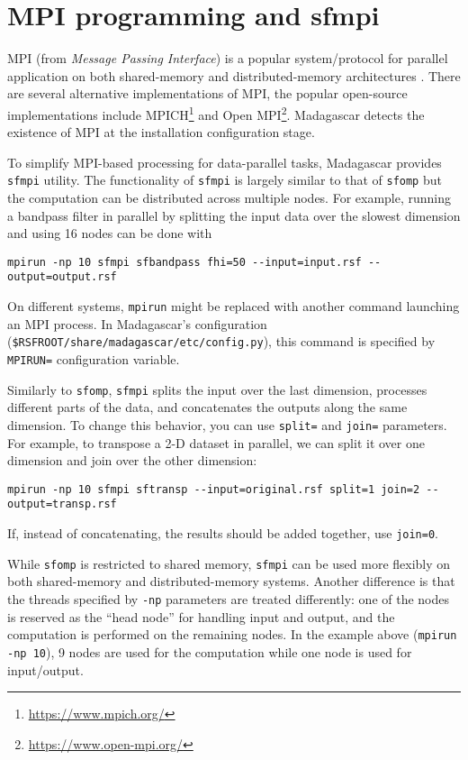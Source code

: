 \section{MPI programming and sfmpi}

MPI (from \emph{Message Passing Interface}) is a popular
system/protocol for parallel application on both shared-memory and
distributed-memory architectures \cite[]{pacheco,gropp}. There are several alternative
implementations of MPI, the popular open-source implementations
include MPICH\footnote{\url{https://www.mpich.org/}} and Open
MPI\footnote{\url{https://www.open-mpi.org/}}. Madagascar detects the
existence of MPI at the installation configuration stage. 

To simplify MPI-based processing for data-parallel tasks, Madagascar
provides \texttt{sfmpi} utility. The functionality of \texttt{sfmpi}
is largely similar to that of \texttt{sfomp} but the computation can
be distributed across multiple nodes. For example, running a bandpass
filter in parallel by splitting the input data over the slowest
dimension and using 16 nodes can be done with
\begin{verbatim}
mpirun -np 10 sfmpi sfbandpass fhi=50 --input=input.rsf --output=output.rsf
\end{verbatim}
On different systems, \texttt{mpirun} might be replaced with another
command launching an MPI process. In Madagascar's configuration
(\texttt{\$RSFROOT/share/madagascar/etc/config.py}), this command is
specified by \texttt{MPIRUN=} configuration variable.

Similarly to \texttt{sfomp}, \texttt{sfmpi} splits the input over the last dimension,
processes different parts of the data, and concatenates the outputs
along the same dimension. To change this behavior, you can use
\texttt{split=} and \texttt{join=} parameters. For example, to
transpose a 2-D dataset in parallel, we can split it over one
dimension and join over the other dimension:
\begin{verbatim}
mpirun -np 10 sfmpi sftransp --input=original.rsf split=1 join=2 --output=transp.rsf
\end{verbatim}
If, instead of concatenating, the results should be added together, use \texttt{join=0}.

While \texttt{sfomp} is restricted to shared memory, \texttt{sfmpi}
can be used more flexibly on both shared-memory and distributed-memory
systems. Another difference is that the threads specified by
\texttt{-np} parameters are treated differently: one of the nodes is
reserved as the ``head node'' for handling input and output, and the
computation is performed on the remaining nodes. In the example above
(\texttt{mpirun -np 10}), 9 nodes are used for the computation while
one node is used for input/output.

